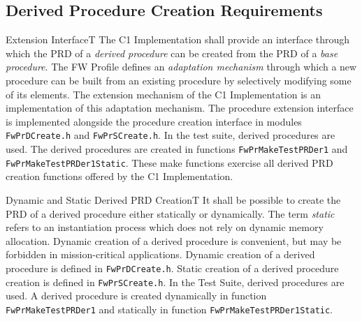 \documentclass[a4paper,10pt]{article}
\newenvironment{fw_req}[6]
{\addtocounter{subsubsection}{1}
	\hspace{0.2cm}\textbf{FW-\arabic{section}.\arabic{subsection}.\arabic{subsubsection}/#2
	\hspace{0.8cm} #1}
	\vspace{-10pt}
\begin{longtable}{p{2.7cm}P{8.5cm}}
\hline
\textsc{Requirement} & #3 \\
\textsc{Justification} & #4 \\
\textsc{Implementation} & #5  \\ 
\textsc{Verification} & #6  \\
\hline
}
{\end{longtable}}
\newenvironment{fw_req_note}[7]
{\addtocounter{subsubsection}{1}
	\hspace{0.2cm}\textbf{FW-\arabic{section}.\arabic{subsection}.\arabic{subsubsection}/#2
	\hspace{0.8cm} #1}
	\vspace{-10pt}
\begin{longtable}{p{2.7cm}P{8.5cm}}
\hline
\textsc{Requirement} & #3 \\
\textsc{Note} & #4 \\
\textsc{Justification} & #5 \\
\textsc{Implementation} & #6  \\ 
\textsc{Verification} & #7  \\
\hline
}
{\end{longtable}}
\begin{document}
\subsection{Derived Procedure Creation Requirements}

\begin{fw_req}{Extension Interface}{T}
{The C1 Implementation shall provide an interface through which the PRD of a \emph{derived procedure} can be created from the PRD of a \emph{base procedure}.}
{The FW Profile defines an \emph{adaptation mechanism} through which a new procedure can be built 
from an existing procedure by selectively modifying some of its elements. The extension mechanism of the C1 Implementation is an 
implementation of this adaptation mechanism.}
{The procedure extension interface is implemented alongside the procedure creation interface in 
modules \texttt{FwPrDCreate.h} and \texttt{FwPrSCreate.h}.} 
{In the test suite, derived procedures are used. The derived procedures are created in functions 
\texttt{FwPrMakeTestPRDer1} and \texttt{FwPrMakeTestPRDer1Static}. These make functions exercise all derived PRD creation functions offered 
by the C1 Implementation.}
\end{fw_req}


\begin{fw_req_note}{Dynamic and Static Derived PRD Creation}{T}
{It shall be possible to create the PRD of a derived procedure either statically or dynamically.}
{The term \emph{static} refers to an instantiation process which does not rely on dynamic memory
allocation.}
{Dynamic creation of a derived procedure is convenient, but may be forbidden in mission-critical applications.}
{Dynamic creation of a derived procedure is defined in \texttt{FwPrDCreate.h}. 
Static creation of a derived procedure creation is defined in \texttt{FwPrSCreate.h}.} 
{In the Test Suite, derived procedures are used. A derived procedure is created dynamically in 
function \texttt{FwPrMakeTestPRDer1} and statically in function \texttt{FwPrMakeTestPRDer1Static}.}
\end{fw_req_note}
\end{document}
